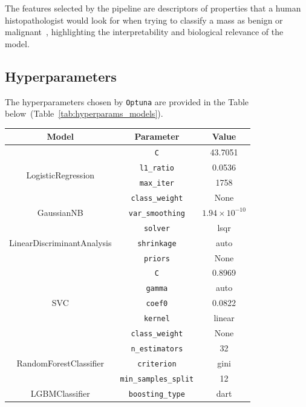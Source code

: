 \documentclass[12pt]{article}
\begin{document}
The features selected by the pipeline are descriptors of properties that a human
histopathologist would look for when trying to classify a mass as benign or
malignant~\cite{Weigelt_2010}, highlighting the interpretability and biological
relevance of the model.


\subsection{Hyperparameters}

The hyperparameters chosen by \texttt{Optuna} are provided in the Table below\
(Table~\ref{tab:hyperparams_models}).

\begin{table}[H]
    \centering
    \begin{tabular}{|c|c|c|}
    \hline
    \textbf{Model} & \textbf{Parameter} & \textbf{Value} \\
    \hline
    \multirow{4}{*}{LogisticRegression}
      & \texttt{C} & 43.7051 \\
      & \texttt{l1\_ratio} & 0.0536 \\
      & \texttt{max\_iter} & 1758 \\
      & \texttt{class\_weight} & None \\
    \hline
    \multirow{1}{*}{GaussianNB}
      & \texttt{var\_smoothing} & $1.94 \times 10^{-10}$ \\
    \hline
    \multirow{3}{*}{LinearDiscriminantAnalysis}
      & \texttt{solver} & lsqr \\
      & \texttt{shrinkage} & auto \\
      & \texttt{priors} & None \\
    \hline
    \multirow{5}{*}{SVC}
      & \texttt{C} & 0.8969 \\
      & \texttt{gamma} & auto \\
      & \texttt{coef0} & 0.0822 \\
      & \texttt{kernel} & linear \\
      & \texttt{class\_weight} & None \\
    \hline
    \multirow{3}{*}{RandomForestClassifier}
      & \texttt{n\_estimators} & 32 \\
      & \texttt{criterion} & gini \\
      & \texttt{min\_samples\_split} & 12 \\
    \hline
    \multirow{10}{*}{LGBMClassifier}
      & \texttt{boosting\_type} & dart \\

\end{tabular}
\end{table}
\end{document}
